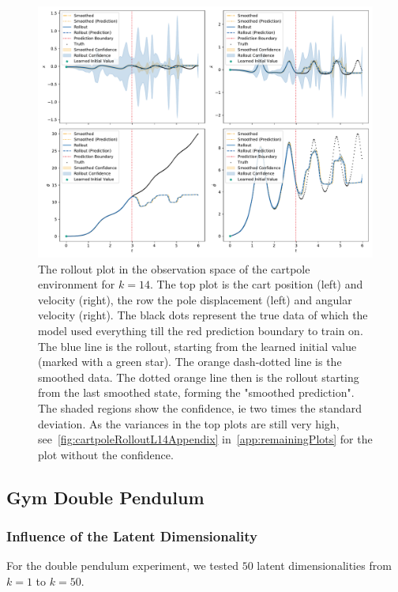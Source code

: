 			\begin{figure}
				\centering
				\includegraphics[width=\linewidth]{figures/results/cartpole-gym/run-latent-dim-14/rollout-observations-N0.pdf}
				\caption{The rollout plot in the observation space of the cartpole environment for \(k = 14\). The top plot is the cart position (left) and velocity (right), the row the pole displacement (left) and angular velocity (right). The black dots represent the true data of which the model used everything till the red prediction boundary to train on. The blue line is the rollout, starting from the learned initial value (marked with a green star). The orange dash-dotted line is the smoothed data. The dotted orange line then is the rollout starting from the last smoothed state, forming the "smoothed prediction". The shaded regions show the confidence, \ac{ie} two times the standard deviation. As the variances in the top plots are still very high, see~\autoref{fig:cartpoleRolloutL14Appendix} in~\autoref{app:remainingPlots} for the plot without the confidence.}
				\label{fig:cartpoleRolloutL14}
			\end{figure}

	\subsection{Gym Double Pendulum} %

		\subsubsection{Influence of the Latent Dimensionality}
			For the double pendulum experiment, we tested \(50\) latent dimensionalities from \( k = 1 \) to \( k = 50 \).

